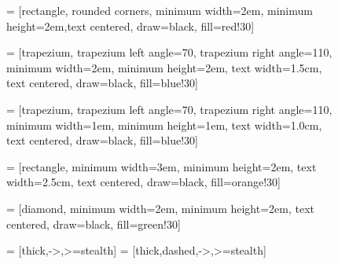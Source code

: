 \begin{figure}[H]
\vspace{1cm}
  \centering

 = [rectangle, rounded corners, minimum width=2em, minimum height=2em,text centered, draw=black, fill=red!30]

 = [trapezium, trapezium left angle=70, trapezium right angle=110, minimum width=2em, minimum height=2em, text width=1.5cm, text centered, draw=black, fill=blue!30]

 = [trapezium, trapezium left angle=70, trapezium right angle=110, minimum width=1em, minimum height=1em, text width=1.0cm, text centered, draw=black, fill=blue!30]

 = [rectangle, minimum width=3em, minimum height=2em, text width=2.5cm, text centered, draw=black, fill=orange!30]

 = [diamond, minimum width=2em, minimum height=2em, text centered, draw=black, fill=green!30]

 = [thick,->,>=stealth]
 = [thick,dashed,->,>=stealth]

\end{figure}
